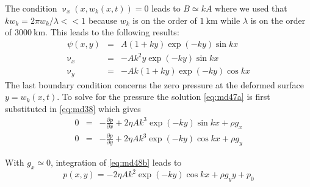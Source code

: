 \vspace{0.5cm}
\vspace{0.5cm}

The condition $\upnu_x(x,w_k(x,t))=0$ leads to $B\simeq kA$ where we used that
$k w_k = 2\pi w_k/\lambda <<1$ because $w_k$ is on the order of $1~\si{\km}$ 
while $\lambda$ is on the order of $3000~\si{\km}$.
This leads to the following results:
\begin{eqnarray}
\psi(x,y) &=& A(1+ky)\exp (-ky) \sin kx \label{eq:md47a}\\
\upnu_x &=& -A k^2 y \exp (-ky) \sin kx \\
\upnu_y &=& -Ak(1+ky) \exp(-ky) \cos kx \label{eq:md47}
\end{eqnarray}
The last boundary condition concerns the zero pressure at the deformed surface 
$y=w_k(x,t)$.
To solve for the pressure the solution \eqref{eq:md47a} is 
first substituted in \eqref{eq:md38} which gives
\begin{eqnarray}
0 &=& -\frac{\partial p}{\partial x} + 2\eta A k^3 \exp (-ky) \sin kx + \rho g_x 
\label{eq:md48a}
\\
0 &=& -\frac{\partial p}{\partial y} + 2\eta A k^3 \exp (-ky) \cos kx + \rho g_y 
\label{eq:md48b}
\end{eqnarray}

\vspace{0.5cm}
\vspace{0.5cm}

With $g_x\simeq 0$, integration of \eqref{eq:md48b} leads to
\begin{equation}
p(x,y) = -2\eta A k^2 \exp (-ky) \cos kx + \rho g_y y + p_0
\label{eq:md49}
\end{equation} 

\vspace{0.5cm}
\vspace{0.5cm}

